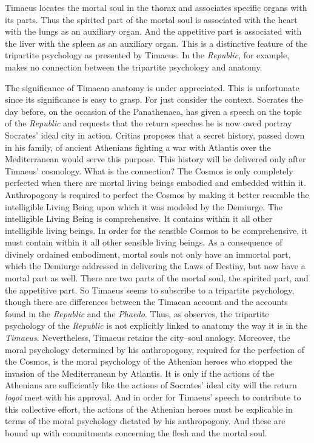Timaeus locates the mortal soul in the thorax and associates specific organs with its parts. Thus the spirited part of the mortal soul is associated with the heart with the lungs as an auxiliary organ. And the appetitive part is associated with the liver with the spleen as an auxiliary organ. This is a distinctive feature of the tripartite psychology as presented by Timaeus. In the \emph{Republic}, for example, makes no connection between the tripartite psychology and anatomy. 

The significance of Timaean anatomy is under appreciated. This is unfortunate since its significance is easy to grasp. For just consider the context. Socrates the day before, on the occasion of the Panathenaea, has given a speech on the topic of the \emph{Republic} and requests that the return speeches he is now owed portray Socrates' ideal city in action. Critias proposes that a secret history, passed down in his family, of ancient Athenians fighting a war with Atlantis over the Mediterranean would serve this purpose. This history will be delivered only after Timaeus' cosmology. What is the connection? The Cosmos is only completely perfected when there are mortal living beings embodied and embedded within it. Anthropogony is required to perfect the Cosmos by making it better resemble the intelligible Living Being upon which it was modeled by the Demiurge. The intelligible Living Being is comprehensive. It contains within it all other intelligible living beings. In order for the sensible Cosmos to be comprehensive, it must contain within it all other sensible living beings. As a consequence of divinely ordained embodiment, mortal souls not only have an immortal part, which the Demiurge addressed in delivering the Laws of Destiny, but now have a mortal part as well. There are two parts of the mortal soul, the spirited part, and the appetitive part. So Timaeus seems to subscribe to a tripartite psychology, though there are differences between the Timaean account and the accounts found in the \emph{Republic} and the \emph{Phaedo}. Thus, as \citet[496]{Taylor:1928qb} observes, the tripartite psychology of the \emph{Republic} is not explicitly linked to anatomy the way it is in the \emph{Timaeus}. Nevertheless, Timaeus retains the city--soul analogy. Moreover, the moral psychology determined by his anthropogony, required for the perfection of the Cosmos, is the moral psychology of the Athenian heroes who stopped the invasion of the Mediterranean by Atlantis. It is only if the actions of the Athenians are sufficiently like the actions of Socrates' ideal city will the return \emph{logoi} meet with his approval. And in order for Timaeus' speech to contribute to this collective effort, the actions of the Athenian heroes must be explicable in terms of the moral psychology dictated by his anthropogony. And these are bound up with commitments concerning the flesh and the mortal soul.

